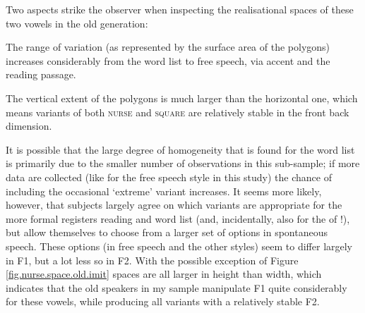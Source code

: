 Two aspects strike the observer when inspecting the realisational spaces of these two vowels in the old generation:
\begin{inparaenum}[(1)]
	\item The range of variation (as represented by the surface area of the polygons) increases considerably from the word list to free speech, via accent  and the reading passage.
	\item The vertical extent of the polygons is much larger than the horizontal one, which means variants of both \textsc{nurse} and \textsc{square} are relatively stable in the front back dimension.
\end{inparaenum}
It is possible that the large degree of homogeneity that is found for the word list is primarily due to the smaller number of observations in this sub-sample; if more data are collected (like for the free speech style in this study) the chance of including the occasional `extreme' variant increases.
It seems more likely, however, that subjects largely agree on which variants are appropriate for the more formal registers reading and word list (and, incidentally, also for the  of !), but allow themselves to choose from a larger set of options in spontaneous speech.
These options (in free speech and the other styles) seem to differ largely in F1, but a lot less so in F2.
With the possible exception of Figure \ref{fig.nurse.space.old.imit}  spaces are all larger in height than width, which indicates that the old speakers in my sample manipulate F1 quite considerably for these vowels, while producing all variants with a relatively stable F2.

